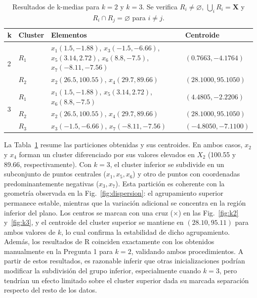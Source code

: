 \documentclass[10pt,a4paper]{article}
\begin{document}
\begin{table}[H]
\centering
\scriptsize
\begin{tabular}{@{}p{0.9cm} p{1.1cm} p{8.7cm} p{3.2cm}@{}}
\toprule
\textbf{k} & \textbf{Cluster} & \textbf{Elementos} & \textbf{Centroide} \\
\midrule
\multirow{2}{*}{2} & $R_1$ & $x_1(1.5, -1.88)$, $x_3(-1.5, -6.66)$, $x_5(3.14, 2.72)$, $x_6(8.8, -7.5)$, $x_7(-8.11, -7.56)$ & $(0.7663, -4.1764)$ \\
& $R_2$ & $x_2(26.5, 100.55)$, $x_4(29.7, 89.66)$ & $(28.1000, 95.1050)$ \\
\midrule
\multirow{3}{*}{3} & $R_1$ & $x_1(1.5, -1.88)$, $x_5(3.14, 2.72)$, $x_6(8.8, -7.5)$ & $(4.4805, -2.2206)$ \\
& $R_2$ & $x_2(26.5, 100.55)$, $x_4(29.7, 89.66)$ & $(28.1000, 95.1050)$ \\
& $R_3$ & $x_3(-1.5, -6.66)$, $x_7(-8.11, -7.56)$ & $(-4.8050, -7.1100)$ \\
\bottomrule
\end{tabular}
\caption{Resultados de k-medias para $k=2$ y $k=3$. Se verifica $R_i \neq \varnothing$, $\bigcup_i R_i = \mathbf{X}$ y $R_i \cap R_j = \varnothing$ para $i \neq j$.}
\label{tab:resultados-r}
\end{table}

La Tabla~\ref{tab:resultados-r} resume las particiones obtenidas y sus centroides. En ambos casos, $x_2$ y $x_4$ forman un cluster diferenciado por sus valores elevados en $X_2$ (100.55 y 89.66, respectivamente). Con $k=3$, el cluster inferior se subdivide en un subconjunto de puntos centrales ($x_1, x_5, x_6$) y otro de puntos con coordenadas predominantemente negativas ($x_3, x_7$). Esta partici\'on es coherente con la geometr\'ia observada en la Fig.~\ref{fig:dispersion}: el agrupamiento superior permanece estable, mientras que la variaci\'on adicional se concentra en la regi\'on inferior del plano. Los centros se marcan con una cruz ($\times$) en las Fig.~\ref{fig:k2} y~\ref{fig:k3}, y el centroide del cluster superior se mantiene en $(28.10, 95.11)$ para ambos valores de $k$, lo cual confirma la estabilidad de dicho agrupamiento. Adem\'as, los resultados de R coinciden exactamente con los obtenidos manualmente en la Pregunta 1 para $k=2$, validando ambos procedimientos. A partir de estos resultados, es razonable inferir que otras inicializaciones podr\'ian modificar la subdivisi\'on del grupo inferior, especialmente cuando $k=3$, pero tendr\'ian un efecto limitado sobre el cluster superior dada su marcada separaci\'on respecto del resto de los datos.
\end{document}
